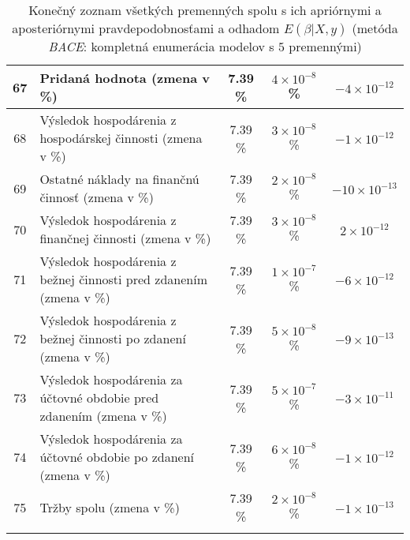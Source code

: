 \begin{longtable}{ |c|p{5cm}|c|c|c| }
        \hline
        67 & Pridaná hodnota (zmena v \%) & 7.39 \% & \(4 \times 10^{-8}\) \% & \(-4 \times 10^{-12}\) \\
        \hline
        68 & Výsledok hospodárenia z hospodárskej činnosti (zmena v \%) & 7.39 \% & \(3 \times 10^{-8}\) \% & \(-1 \times 10^{-12}\) \\
        \hline
        69 & Ostatné náklady na finančnú činnosť (zmena v \%) & 7.39 \% & \(2 \times 10^{-8}\) \% & \(-10 \times 10^{-13}\) \\
        \hline
        70 & Výsledok hospodárenia z finančnej činnosti (zmena v \%) & 7.39 \% & \(3 \times 10^{-8}\) \% & \(2 \times 10^{-12}\) \\
        \hline
        71 & Výsledok hospodárenia z bežnej činnosti pred zdanením (zmena v \%) & 7.39 \% & \(1 \times 10^{-7}\) \% & \(-6 \times 10^{-12}\) \\
        \hline
        72 & Výsledok hospodárenia z bežnej činnosti po zdanení (zmena v \%) & 7.39 \% & \(5 \times 10^{-8}\) \% & \(-9 \times 10^{-13}\) \\
        \hline
        73 & Výsledok hospodárenia za účtovné obdobie pred zdanením (zmena v \%) & 7.39 \% & \(5 \times 10^{-7}\) \% & \(-3 \times 10^{-11}\) \\
        \hline
        74 & Výsledok hospodárenia za účtovné obdobie po zdanení (zmena v \%) & 7.39 \% & \(6 \times 10^{-8}\) \% & \(-1 \times 10^{-12}\) \\
        \hline
        75 & Tržby spolu (zmena v \%) & 7.39 \% & \(2 \times 10^{-8}\) \% & \(-1 \times 10^{-13}\) \\
        \hline
    \caption{Konečný zoznam všetkých premenných spolu s ich apriórnymi a aposteriórnymi pravdepodobnosťami a odhadom \(E(\beta|X, y)\) (metóda \emph{BACE}: kompletná enumerácia modelov s \(5\) premennými)}
    \label{bace1_pp}
\end{longtable}